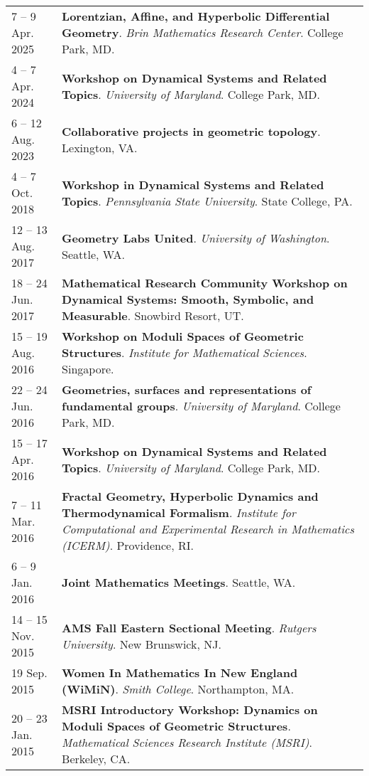     \begin{center}
    {
    \renewcommand{\arraystretch}{1.5}
    \begin{longtable}{p{}  p{}}
    7  -- 9 Apr.  2025 & \textbf{Lorentzian, Affine, and Hyperbolic Differential Geometry}. \textit{Brin Mathematics Research Center}.  College Park, MD.  \\ 
4  -- 7 Apr.  2024 & \textbf{Workshop on Dynamical Systems and Related Topics}. \textit{University of Maryland}.  College Park, MD.  \\ 
6  -- 12 Aug.  2023 & \textbf{Collaborative projects in geometric topology}.  Lexington, VA.  \\ 
4  -- 7 Oct.  2018 & \textbf{Workshop in Dynamical Systems and Related Topics}. \textit{Pennsylvania State University}.  State College, PA.  \\ 
12  -- 13 Aug.  2017 & \textbf{Geometry Labs United}. \textit{University of Washington}.  Seattle, WA.  \\ 
18  -- 24 Jun.  2017 & \textbf{Mathematical Research Community Workshop on Dynamical Systems:
Smooth, Symbolic, and Measurable}.  Snowbird Resort, UT.  \\ 
15  -- 19 Aug.  2016 & \textbf{Workshop on Moduli Spaces of Geometric Structures}. \textit{Institute for Mathematical Sciences}.  Singapore.  \\ 
22  -- 24 Jun.  2016 & \textbf{Geometries, surfaces and representations of fundamental groups}. \textit{University of Maryland}.  College Park, MD.  \\ 
15  -- 17 Apr.  2016 & \textbf{Workshop on Dynamical Systems and Related Topics}. \textit{University of Maryland}.  College Park, MD.  \\ 
7  -- 11 Mar.  2016 & \textbf{Fractal Geometry, Hyperbolic Dynamics and Thermodynamical Formalism}. \textit{Institute for Computational and Experimental Research in Mathematics (ICERM)}.  Providence, RI.  \\ 
6  -- 9 Jan.  2016 & \textbf{Joint Mathematics Meetings}.  Seattle, WA.  \\ 
14  -- 15 Nov.  2015 & \textbf{AMS Fall Eastern Sectional Meeting}. \textit{Rutgers University}.  New Brunswick, NJ.  \\ 
19 Sep.  2015 & \textbf{Women In Mathematics In New England (WiMiN)}. \textit{Smith College}.  Northampton, MA.  \\ 
20  -- 23 Jan.  2015 & \textbf{MSRI Introductory Workshop: Dynamics on Moduli Spaces of Geometric Structures}. \textit{Mathematical Sciences Research Institute (MSRI)}.  Berkeley, CA.  \\ 

\end{longtable}}
\end{center}
